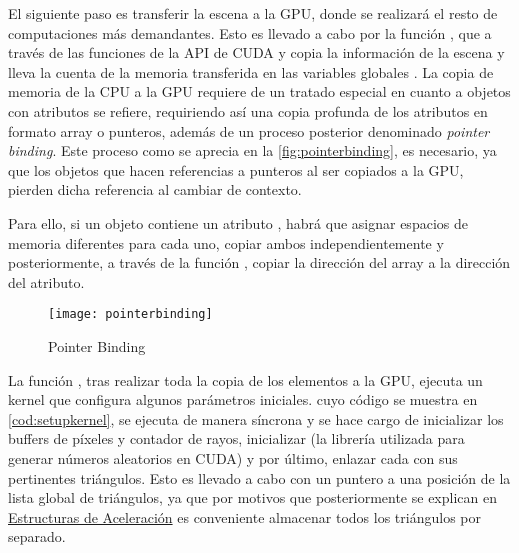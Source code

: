 El siguiente paso es transferir la escena a la GPU, donde se realizará el resto de computaciones más demandantes. Esto es llevado a cabo por la función , que a través de las funciones de la API de CUDA  y  copia la información de la escena y lleva la cuenta de la memoria transferida en las variables globales . La copia de memoria de la CPU a la GPU requiere de un tratado especial en cuanto a objetos con atributos se refiere, requiriendo así una copia profunda de los atributos en formato array o punteros, además de un proceso posterior denominado \emph{pointer binding}. Este proceso como se aprecia en la \autoref{fig:pointerbinding}, es necesario, ya que los objetos que hacen referencias a punteros al ser copiados a la GPU, pierden dicha referencia al cambiar de contexto. 

Para ello, si un objeto  contiene un atributo , habrá que asignar espacios de memoria diferentes para cada uno, copiar ambos independientemente y posteriormente, a través de la función , copiar la dirección del array a la dirección del atributo.


\begin{figure}[H]
    \centering
	\texttt{[image: pointerbinding]}
	\caption{Pointer Binding}
	\label{fig:pointerbinding}
\end{figure}


La función , tras realizar toda la copia de los elementos a la GPU, ejecuta un kernel que configura algunos parámetros iniciales.  cuyo código se muestra en \autoref{cod:setupkernel}, se ejecuta de manera síncrona y se hace cargo de inicializar los buffers de píxeles y contador de rayos, inicializar  (la librería utilizada para generar números aleatorios en CUDA) y por último, enlazar cada  con sus pertinentes triángulos. Esto es llevado a cabo con un puntero a una posición de la lista global de triángulos, ya que por motivos que posteriormente se explican en \hyperref[BVH]{Estructuras de Aceleración} es conveniente almacenar todos los triángulos por separado. 


